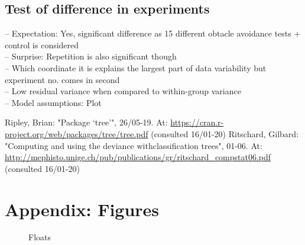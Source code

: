 \documentclass[12pt,fleqn]{article}
\begin{document}
\subsection{Test of difference in experiments}
-- Expectation: Yes, significant difference as 15 different obtacle avoidance tests + control is considered\\
-- Surprise: Repetition is also significant though\\
-- Which coordinate it is explains the largest part of data variability but experiment no. comes in second\\
-- Low residual variance when compared to within-group variance\\
-- Model assumptions: Plot\\
\begin{thebibliography}{9}
	 Ripley, Brian: "Package ‘tree’", 26/05-19. At: \url{https://cran.r-project.org/web/packages/tree/tree.pdf} (consulted 16/01-20)
	 Ritschard, Gilbard: "Computing and using the deviance withclassification trees", 01-06. At:
	\url{http://mephisto.unige.ch/pub/publications/gr/ritschard_compstat06.pdf} (consulted 16/01-20)
\end{thebibliography}
\appendix
\section{Appendix: Figures}
\begin{figure}[H]
	
	\centering
	\caption{Floats}
	\label{fig:2dtrajects}
\end{figure}
\end{document}
